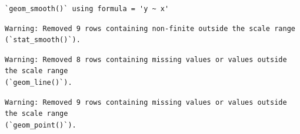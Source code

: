 \documentclass[
  letterpaper,
  DIV=11,
  numbers=noendperiod]{scrartcl}
\newenvironment{Shaded}{\begin{snugshade}}{\end{snugshade}}
\newcommand{\AttributeTok}[1]{\textcolor[rgb]{0.40,0.45,0.13}{#1}}
\newcommand{\ConstantTok}[1]{\textcolor[rgb]{0.56,0.35,0.01}{#1}}
\newcommand{\DecValTok}[1]{\textcolor[rgb]{0.68,0.00,0.00}{#1}}
\newcommand{\FloatTok}[1]{\textcolor[rgb]{0.68,0.00,0.00}{#1}}
\newcommand{\FunctionTok}[1]{\textcolor[rgb]{0.28,0.35,0.67}{#1}}
\newcommand{\NormalTok}[1]{\textcolor[rgb]{0.00,0.23,0.31}{#1}}
\newcommand{\SpecialCharTok}[1]{\textcolor[rgb]{0.37,0.37,0.37}{#1}}
\newcommand{\StringTok}[1]{\textcolor[rgb]{0.13,0.47,0.30}{#1}}
\begin{document}
\begin{Shaded}
\end{Shaded}

\begin{verbatim}
`geom_smooth()` using formula = 'y ~ x'
\end{verbatim}

\begin{verbatim}
Warning: Removed 9 rows containing non-finite outside the scale range
(`stat_smooth()`).
\end{verbatim}

\begin{verbatim}
Warning: Removed 8 rows containing missing values or values outside the scale range
(`geom_line()`).
\end{verbatim}

\begin{verbatim}
Warning: Removed 9 rows containing missing values or values outside the scale range
(`geom_point()`).
\end{verbatim}
\end{document}
